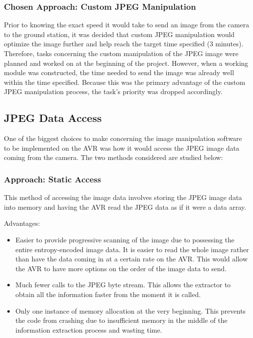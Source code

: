 \subsubsection{Chosen Approach: Custom JPEG Manipulation}

Prior to knowing the exact speed it would take to send 
an image from the camera to the ground station, 
it was decided that custom JPEG manipulation would optimize 
the image further and help reach the target time specified (3 minutes). 
Therefore, tasks concerning the custom manipulation of 
the JPEG image were planned and worked on 
at the beginning of the project. 
However, when a working module was constructed, the time needed to 
send the image was already well within the time specified. 
Because this was the primary advantage of the 
custom JPEG manipulation process, 
the task's priority was dropped accordingly.

\subsection{JPEG Data Access}

One of the biggest choices to make concerning the 
image manipulation software to be implemented on the AVR was 
how it would  access the JPEG image data coming from the camera. 
The two methods considered are studied below:

\subsubsection{Approach: Static Access}

This method of accessing the image data involves storing 
the JPEG image data into memory and 
having the AVR read the JPEG data as if it were a data array. 

Advantages:
\begin{itemize}
	\item Easier to provide progressive scanning of the 
		image due to possessing the entire 
		entropy-encoded image data. It is easier to 
		read the whole image rather than 
		have the data coming in at a certain rate on the AVR.
		This would allow the AVR to have more options on
		the order of the image data to send.
	\item Much fewer calls to the JPEG byte stream. 
		This allows the extractor to obtain all the 
		information faster from the moment it is called.
	\item Only one instance of memory allocation at the very beginning. 
		This prevents the code from crashing due to insufficient 
		memory in the middle of the information 
		extraction process and wasting time.
\end{itemize}


